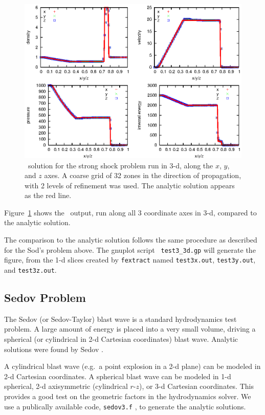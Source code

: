 \begin{figure}[t]
\centering
\includegraphics[width=5.0in]{CastroVerification/test3_3d}
\caption{\label{fig:test3} \castro\ solution for the strong shock
  problem run in 3-d, along the $x$, $y$, and $z$ axes.  A coarse grid
  of 32 zones in the direction of propagation, with 2 levels of
  refinement was used.  The analytic solution appears as the red
  line.}
\end{figure}

Figure~\ref{fig:test3} shows the \castro\ output, run along all 3
coordinate axes in 3-d, compared to the analytic solution.  

The comparison to the analytic solution follows the same procedure as
described for the Sod's problem above.  The gnuplot script {\tt
  test3\_3d.gp} will generate the figure, from the 1-d slices created by
{\tt fextract} named {\tt test3x.out}, {\tt test3y.out}, and {\tt test3z.out}.


\subsection{Sedov Problem}

The Sedov (or Sedov-Taylor) blast wave is a standard hydrodynamics
test problem.  A large amount of energy is placed into a very small
volume, driving a spherical (or cylindrical in 2-d Cartesian
coordinates) blast wave.  Analytic solutions were found by Sedov
\cite{sedov:1959}.  

A cylindrical blast wave (e.g.\ a point explosion in a 2-d plane) can
be modeled in 2-d Cartesian coordinates.  A spherical blast wave can
be modeled in 1-d spherical, 2-d axisymmetric (cylindrical $r$-$z$), or 3-d
Cartesian coordinates.  This provides a good test on the geometric
factors in the hydrodynamics solver.
We use a publically available code, {\tt sedov3.f}
\cite{timmes_sedov_code}, to generate the analytic solutions.

